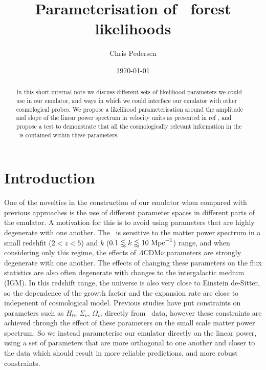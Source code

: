 \documentclass[preprintnumbers,prd,superscriptaddress,notitlepage,nofootinbib] {revtex4-1}
\begin{document}
\title{Parameterisation of \lya\ forest likelihoods}

\author{Chris Pedersen} %

\date{\today}

\begin{abstract}
In this short internal note we discuss different sets of likelihood parameters
we could use in our emulator, and ways in which we could interface our emulator
with other cosmological probes. We propose a likelihood parameterisation around
the amplitude and slope of the linear power spectrum in velocity units as
presented in ref \cite{McDonald2005a}, and propose a test to demonstrate that
all the cosmologically relevant information in the \lyaf\ is contained within
these parameters.
\end{abstract}

\maketitle

\section{Introduction}
One of the novelties in the construction of our emulator when compared with
previous approaches is the use of different parameter spaces in different parts
of the emulator. A motivation for this is to avoid using parameters that are
highly degenerate with one another. The \lyaf\ is
sensitive to the matter power spectrum in a small redshfit ($2<z<5$) and
$k$ ($0.1\lessapprox k \lessapprox 10 \ \text{Mpc}^{-1} $) range, and when considering only
this regime, the effects of $\Lambda$CDM$\nu$ parameters are strongly degenerate with
one another\cite{Pedersen2020}. The effects of changing these parameters on the flux statistics are also
often degenerate with changes to the intergalactic medium (IGM). In this redshift
range, the universe is also very close to Einstein de-Sitter, so the dependence of the
growth factor and the expansion rate are close to indepenent of cosmological model.
Previous studies have put constraints on parameters such as $H_0$, $\Sigma_\nu$,
$\Omega_m$ directly from \lyaf\ data\cite{Yeche2017},
however these constraints are achieved
through the effect of these parameters on the small scale matter power spectrum.
So we instead parameterise our emulator directly on the linear power, using a set of
parameters that are more orthogonal to one another and closer to the data which should
result in more reliable predictions, and more robust constraints.
\end{document}
